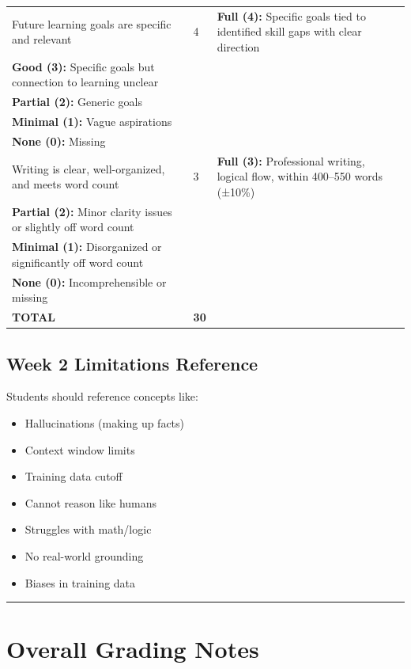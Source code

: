 \documentclass[11pt]{article}
\begin{document}
\begin{longtable}{|p{5cm}|p{2cm}|p{8cm}|}
Future learning goals are specific and relevant & 4 & 
\textbf{Full (4):} Specific goals tied to identified skill gaps with clear direction \\
\textbf{Good (3):} Specific goals but connection to learning unclear \\
\textbf{Partial (2):} Generic goals \\
\textbf{Minimal (1):} Vague aspirations \\
\textbf{None (0):} Missing \\
\hline

Writing is clear, well-organized, and meets word count & 3 & 
\textbf{Full (3):} Professional writing, logical flow, within 400--550 words (±10\%) \\
\textbf{Partial (2):} Minor clarity issues or slightly off word count \\
\textbf{Minimal (1):} Disorganized or significantly off word count \\
\textbf{None (0):} Incomprehensible or missing \\
\hline

\textbf{TOTAL} & \textbf{30} & \\
\hline
\end{longtable}

\subsection*{Week 2 Limitations Reference}

Students should reference concepts like:
\begin{itemize}
    \item Hallucinations (making up facts)
    \item Context window limits
    \item Training data cutoff
    \item Cannot reason like humans
    \item Struggles with math/logic
    \item No real-world grounding
    \item Biases in training data
\end{itemize}

\hrule
\vspace{0.5cm}

\section{Overall Grading Notes}
\end{document}

